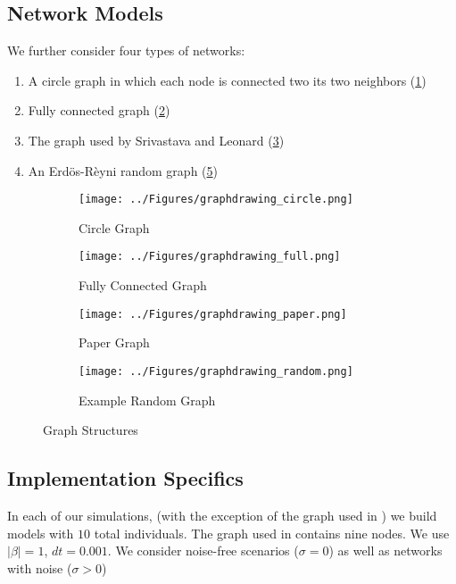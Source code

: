 \documentclass[pageno]{jpaper}
\begin{document}
\subsection{Network Models}
We further consider four types of networks:
\begin{enumerate}
\item A circle graph in which each node is connected two its two neighbors (\ref{fig:graphdrawing_circle})
\item Fully connected graph (\ref{fig:graphdrawing_full})
\item The graph used by Srivastava and Leonard \cite{srivastava_collective_2014} (\ref{fig:graphdrawing_paper})
\item An Erd\"{o}s-R\`{e}yni random graph (\ref{fig:graphdrawing_random})
\end{enumerate}
\begin{figure}[!htb]
\begin{subfigure}[b]{0.5\textwidth}
      \texttt{[image: ../Figures/graphdrawing\_circle.png]}
      \caption{Circle Graph}\label{fig:graphdrawing_circle}
\end{subfigure}
\begin{subfigure}[b]{0.5\textwidth}
      \texttt{[image: ../Figures/graphdrawing\_full.png]}
      \caption{Fully Connected Graph}\label{fig:graphdrawing_full}
\end{subfigure}
\begin{subfigure}[b]{0.5\textwidth}
      \texttt{[image: ../Figures/graphdrawing\_paper.png]}
      \caption{Paper Graph}\label{fig:graphdrawing_paper}
\end{subfigure}
\begin{subfigure}[b]{0.5\textwidth}
      \texttt{[image: ../Figures/graphdrawing\_random.png]}
      \caption{Example Random Graph}\label{fig:graphdrawing_random}
\end{subfigure}
\caption{Graph Structures}
\end{figure}
\subsection{Implementation Specifics}
In each of our simulations, (with the exception of the graph used in \cite{srivastava_collective_2014}) we build models with $10$ total individuals. The graph used in \cite{srivastava_collective_2014} contains nine nodes. We use $|\beta|=1$, $dt=0.001$. We consider noise-free scenarios ($\sigma=0$) as well as networks with noise ($\sigma>0$)
\end{document}
